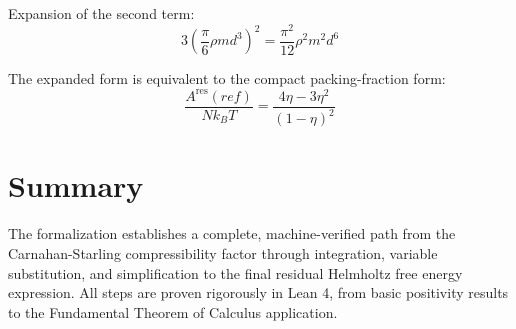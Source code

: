 \begin{theorem}
\label{thm:three_eta_sq_expansion}
\leanok
Expansion of the second term:
$$3 \left(\frac{\pi}{6}\rho md^3\right)^2 = \frac{\pi^2}{12}\rho^2 m^2 d^6$$
\end{theorem}

\begin{theorem}
\label{thm:expanded_cs_reference_term_eq_compact}
\leanok
The expanded form is equivalent to the compact packing-fraction form:
$$\frac{A^{\text{res}}(ref)}{Nk_BT} = \frac{4\eta - 3\eta^2}{(1 - \eta)^2}$$
\end{theorem}

\section{Summary}

The formalization establishes a complete, machine-verified path from the Carnahan-Starling compressibility factor through integration, variable substitution, and simplification to the final residual Helmholtz free energy expression. All steps are proven rigorously in Lean 4, from basic positivity results to the Fundamental Theorem of Calculus application.

